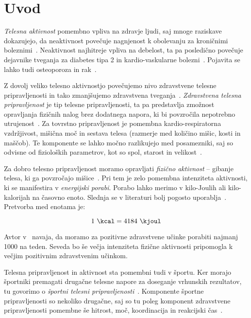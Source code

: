 \chapter{Uvod} \label{uvod}
\emph{Telesna aktivnost} pomembno vpliva na zdravje ljudi, saj mnoge raziskave dokazujejo, da neaktivnost povečuje nagnjenost k obolevanju za kroničnimi boleznimi~\cite{warburton2006health}. Neaktivnost najhitreje vpliva na debelost, ta pa posledično povečuje dejavnike tveganja za diabetes tipa 2 in kardio-vaskularne bolezni~\cite{bassuk2005epidemiological}. Pojavita se lahko tudi osteoporoza in rak~\cite{warburton2006health}. 

Z dovolj veliko telesno aktivnostjo povečujemo nivo zdravstvene telesne pripravljenosti in tako zmanjšujemo zdravstvena tveganja~\cite{caspersen1985physical}. \emph{Zdravstvena telesna pripravljenost} je tip telesne pripravljenosti, ta pa predstavlja zmožnost opravljanja fizičnih nalog brez dodatnega napora, ki bi povzročila nepotrebno utrujenost~\cite{caspersen1985physical}. Za tovrstno pripravljenost je pomembna kardio-respiratorna vzdržjivost, mišična moč in sestava telesa (razmerje med količino mišic, kosti in maščob). Te komponente se lahko močno razlikujejo med posamezniki, saj so odvisne od fizioloških parametrov, kot so spol, starost in velikost~\cite{caspersen1985physical}.

Za dobro telesno pripravljenost moramo opravljati \emph{fizično aktivnost} -- gibanje telesa, ki ga povzročajo mišice~\cite{caspersen1985physical}. Pri tem je zelo pomembna intenziteta aktivnosti, ki se manifestira v \emph{energijski porabi}. Porabo lahko merimo v kilo-Joulih ali kilo-kalorijah na časovno enoto. Slednja se v literaturi bolj pogosto uporablja~\cite{caspersen1985physical}. Pretvorba med enotama je: 

\begin{equation} \label{eq:pretvorba}
	1~\mathrm{\si{\kcal}} = 4184~\mathrm{\si{\kjoul}}
\end{equation}


Avtor v~\cite{warburton2006health} navaja, da moramo za pozitivne zdravstvene učinke porabiti najmanj \SI{1000}{\kcal} na teden. Seveda bo še večja intenziteta fizične aktivnosti pripomogla k večjim pozitivnim zdravstvenim učinkom.

Telesna pripravljenost in aktivnost sta pomembni tudi v športu. Ker morajo športniki premagati drugačne telesne napore za doseganje vrhunskih rezultatov, tu govorimo o \emph{športni telesni pripravljenosti}~\cite{caspersen1985physical}. Komponente športne pripravljenosti so nekoliko drugačne, saj so tu poleg komponent zdravstvene pripravljenosti pomembne še hitrost, moč, koordinacija in reakcijski čas~\cite{caspersen1985physical}.

